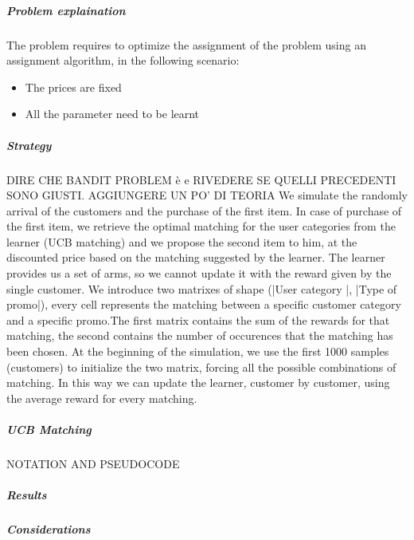 \subparagraph*{Problem explaination}
The problem requires to optimize the assignment of the problem using an assignment algorithm, in the following scenario:
\begin{itemize}
	\item The prices are fixed
	\item All the parameter need to be learnt
\end{itemize}
\subparagraph*{Strategy}
DIRE CHE BANDIT PROBLEM è e RIVEDERE SE QUELLI PRECEDENTI SONO GIUSTI. AGGIUNGERE UN PO' DI TEORIA
We simulate the randomly arrival of the customers and the purchase of the first item. In case of purchase of the first item, we retrieve the optimal matching for the user categories from the learner (UCB matching) and we propose the second item to him, at the discounted price based on the matching suggested by the learner. The learner provides us a set of arms, so we cannot update it with the reward given by the single customer. We introduce two matrixes of shape (|User category |, |Type of promo|), every cell represents the matching between a specific customer category and a specific promo.The first matrix contains the sum of the rewards for that matching, the second contains the number of occurences that the matching has been chosen. At the beginning of the simulation, we use the first 1000 samples (customers) to initialize the two matrix, forcing all the possible combinations of matching. In this way we can update the learner, customer by customer, using the average reward for every matching. 
\subparagraph*{UCB Matching}
NOTATION AND PSEUDOCODE
\subparagraph*{Results}
\subparagraph*{Considerations}